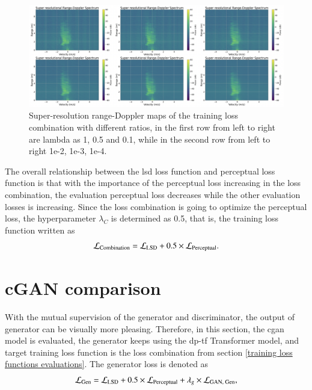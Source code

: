 \begin{figure}
    \centering
    \includegraphics[scale=.45]{figures/evaluation_loss_combination.png}
    \caption{Super-resolution range-Doppler maps of the training loss combination with different ratios, in the first row from left to right are lambda as 1, 0.5 and 0.1, while in the second row from left to right 1e-2, 1e-3, 1e-4.}
    \label{lsd+perceptual combination}
\end{figure}

The overall relationship between the \gls{lsd} loss function and perceptual loss function is that with the importance of the perceptual loss increasing in the loss combination, the evaluation perceptual loss decreases while the other evaluation losses is increasing. Since the loss combination is going to optimize the perceptual loss, the hyperparameter $\lambda_C$ is determined as 0.5, that is, the training loss function written as
\begin{equation}
    \centering
    \mathcal{L}_{\text{Combination}} = \mathcal{L}_{\text{LSD}} + 0.5 \times \mathcal{L}_{\text{Perceptual}}.
    \label{loss combination}
\end{equation}


\section{cGAN comparison} \label{cGAN comparison}
With the mutual supervision of the generator and discriminator, the output of generator can be visually more pleasing. Therefore, in this section, the \gls{cgan} model is evaluated, the generator keeps using the \gls{dp}-\gls{tf} Transformer model, and target training loss function is the loss combination from section \ref{training loss functions evaluations}. The generator loss is denoted as
\begin{equation}
    \centering
    \mathcal{L}_{\text{Gen}} = \mathcal{L}_{\text{LSD}} + 0.5 \times \mathcal{L}_{\text{Perceptual}} + \lambda_g \times \mathcal{L}_{\text{GAN, Gen}},
    \label{loss combination}
\end{equation}


